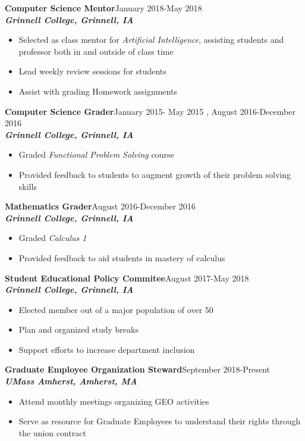 \documentclass[9pt]{extarticle}
\begin{document}
\textbf{Computer Science Mentor}\hfill January 2018-May 2018\\
\textbf{\textit{Grinnell College, Grinnell, IA}}
\begin{itemize}
  \item Selected as class mentor for \textit{Artificial Intelligence}, assisting students and professor both in and
    outside of class time
\item Lead weekly review sessions for students
\item Assist with grading Homework assignments
\end{itemize}

\textbf{Computer Science Grader}\hfill January 2015- May 2015 , August
2016-December 2016\\
\textbf{\textit{Grinnell College, Grinnell, IA}}
\begin{itemize}
\item Graded \textit{Functional Problem Solving} course
\item Provided feedback to students to augment growth of their problem solving skills
\end{itemize}


\textbf{Mathematics Grader}\hfill August 2016-December 2016\\
\textbf{\textit{Grinnell College, Grinnell, IA}}
\begin{itemize}
\item Graded \textit{Calculus 1}
\item Provided feedback to aid students in mastery of calculus
\end{itemize}

\textbf{Student Educational Policy Commitee}\hfill August 2017-May 2018\\
\textbf{\textit{Grinnell College, Grinnell, IA}}
\begin{itemize}
\item Elected member out of a major population of over 50
\item Plan and organized study breaks
\item Support efforts to increase department inclusion
\end{itemize}

\textbf{Graduate Employee Organization Steward}\hfill September 2018-Present\\
\textbf{\textit{UMass Amherst, Amherst, MA}}
\begin{itemize}
\item Attend monthly meetings organizing GEO activities
\item Serve as resource for Graduate Employees to understand their
  rights through the union contract
\end{itemize}
\end{document}
